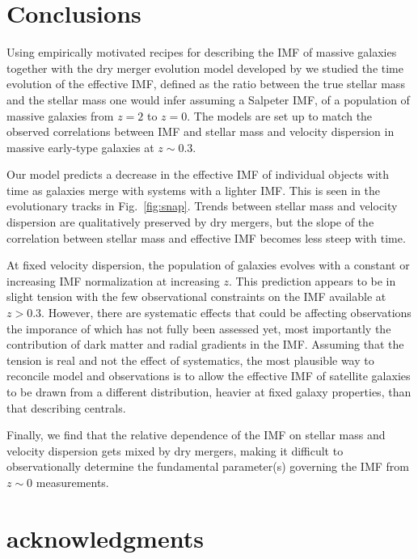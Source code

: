 \documentclass[usenatbib]{mnras}
\def\Fref#1{Fig.~\ref{#1}\xspace}
\begin{document}
\section{Conclusions}\label{sect:concl} 

Using empirically motivated recipes for describing the IMF of massive
galaxies together with the dry merger evolution model developed by
\citet{Nip++12} we studied the time evolution of the effective IMF,
defined as the ratio between the true stellar mass and the stellar
mass one would infer assuming a Salpeter IMF, of a population of
massive galaxies from $z=2$ to $z=0$.  The models are set up to match
the observed correlations between IMF and stellar mass and velocity
dispersion in massive early-type galaxies at $z\sim0.3$.

Our model predicts a decrease in the effective IMF of individual objects with time as
galaxies merge with systems with a lighter IMF. This is seen in the
evolutionary tracks in \Fref{fig:snap}.
Trends between stellar mass
and velocity dispersion are qualitatively preserved by dry mergers,
but the slope of the correlation between stellar mass and effective
IMF becomes less steep with time.  

At fixed velocity
dispersion, the population of galaxies evolves with a constant or
increasing IMF normalization at increasing $z$.  This prediction
appears to be in slight tension with the few observational constraints
on the IMF available at $z>0.3$. However, there are systematic effects
that could be affecting observations the imporance of which has not
fully been assessed yet, most importantly the contribution of dark
matter and radial gradients in the IMF.  
Assuming that the tension is real and not the effect of systematics, the most plausible way to reconcile model and observations is to allow the effective IMF of satellite galaxies to be drawn from a different distribution, heavier at fixed galaxy properties, than that describing centrals.

Finally, we find that the relative
dependence of the IMF on stellar mass and velocity dispersion gets
mixed by dry mergers, making it difficult to observationally determine
the fundamental parameter(s) governing the IMF from $z\sim0$
measurements.



\section*{acknowledgments}
\end{document}
